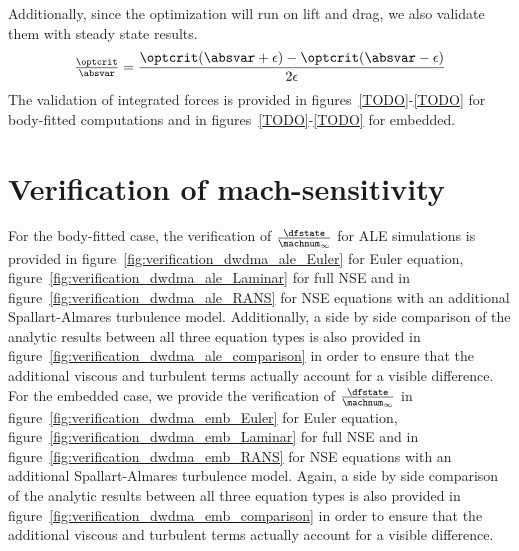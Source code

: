 \documentclass[../main.tex]{subfiles}
\begin{document}
Additionally, since the optimization will run on lift and drag, we also validate them with steady state results.
\begin{align}
\tfrac{\optcrit}{\absvar}=\frac{\optcrit(\absvar+\epsilon)-\optcrit(\absvar-\epsilon)}{2 \epsilon}
\end{align}
The validation of integrated forces is provided in figures~\ref{TODO}-\ref{TODO} for body-fitted computations and in figures~\ref{TODO}-\ref{TODO} for embedded.



\section{Verification of mach-sensitivity}
For the body-fitted case, the verification of $\tfrac{\dfstate}{\machnum_{\infty}}$ for ALE simulations is provided in figure~\ref{fig:verification_dwdma_ale_Euler} for Euler equation, figure~\ref{fig:verification_dwdma_ale_Laminar} for full \ac{NSE} and in figure~\ref{fig:verification_dwdma_ale_RANS} for \ac{NSE} equations with an additional Spallart-Almares turbulence model.
Additionally, a side by side comparison of the analytic results between all three equation types is also provided in figure~\ref{fig:verification_dwdma_ale_comparison} in order to ensure that the additional viscous and turbulent terms actually account for a visible difference.\\
For the embedded case, we provide the verification of $\tfrac{\dfstate}{\machnum_{\infty}}$  in figure~\ref{fig:verification_dwdma_emb_Euler} for Euler equation, figure~\ref{fig:verification_dwdma_emb_Laminar} for full \ac{NSE} and in figure~\ref{fig:verification_dwdma_emb_RANS} for \ac{NSE} equations with an additional Spallart-Almares turbulence model.
Again, a side by side comparison of the analytic results between all three equation types is also provided in figure~\ref{fig:verification_dwdma_emb_comparison} in order to ensure that the additional viscous and turbulent terms actually account for a visible difference.
\end{document}

